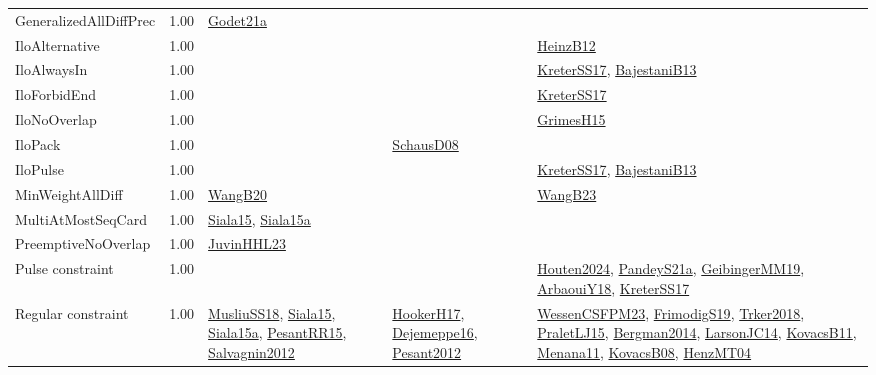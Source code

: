{\begin{longtable}{p{3cm}r>{\raggedright\arraybackslash}p{6cm}>{\raggedright\arraybackslash}p{6cm}>{\raggedright\arraybackslash}p{8cm}}
\index{GeneralizedAllDiffPrec}\index{Constraints!GeneralizedAllDiffPrec}GeneralizedAllDiffPrec &  1.00 & \hyperref[detail:Godet21a]{Godet21a} &  & \\
\index{IloAlternative}\index{Constraints!IloAlternative}IloAlternative &  1.00 &  &  & \hyperref[detail:HeinzB12]{HeinzB12}\\
\index{IloAlwaysIn}\index{Constraints!IloAlwaysIn}IloAlwaysIn &  1.00 &  &  & \hyperref[detail:KreterSS17]{KreterSS17}, \hyperref[detail:BajestaniB13]{BajestaniB13}\\
\index{IloForbidEnd}\index{Constraints!IloForbidEnd}IloForbidEnd &  1.00 &  &  & \hyperref[detail:KreterSS17]{KreterSS17}\\
\index{IloNoOverlap}\index{Constraints!IloNoOverlap}IloNoOverlap &  1.00 &  &  & \hyperref[detail:GrimesH15]{GrimesH15}\\
\index{IloPack}\index{Constraints!IloPack}IloPack &  1.00 &  & \hyperref[detail:SchausD08]{SchausD08} & \\
\index{IloPulse}\index{Constraints!IloPulse}IloPulse &  1.00 &  &  & \hyperref[detail:KreterSS17]{KreterSS17}, \hyperref[detail:BajestaniB13]{BajestaniB13}\\
\index{MinWeightAllDiff}\index{Constraints!MinWeightAllDiff}MinWeightAllDiff &  1.00 & \hyperref[detail:WangB20]{WangB20} &  & \hyperref[detail:WangB23]{WangB23}\\
\index{MultiAtMostSeqCard}\index{Constraints!MultiAtMostSeqCard}MultiAtMostSeqCard &  1.00 & \hyperref[detail:Siala15]{Siala15}, \hyperref[detail:Siala15a]{Siala15a} &  & \\
\index{PreemptiveNoOverlap}\index{Constraints!PreemptiveNoOverlap}PreemptiveNoOverlap &  1.00 & \hyperref[detail:JuvinHHL23]{JuvinHHL23} &  & \\
\index{Pulse constraint}\index{Constraints!Pulse constraint}Pulse constraint &  1.00 &  &  & \hyperref[detail:Houten2024]{Houten2024}, \hyperref[detail:PandeyS21a]{PandeyS21a}, \hyperref[detail:GeibingerMM19]{GeibingerMM19}, \hyperref[detail:ArbaouiY18]{ArbaouiY18}, \hyperref[detail:KreterSS17]{KreterSS17}\\
\index{Regular constraint}\index{Constraints!Regular constraint}Regular constraint &  1.00 & \hyperref[detail:MusliuSS18]{MusliuSS18}, \hyperref[detail:Siala15]{Siala15}, \hyperref[detail:Siala15a]{Siala15a}, \hyperref[detail:PesantRR15]{PesantRR15}, \hyperref[detail:Salvagnin2012]{Salvagnin2012} & \hyperref[detail:HookerH17]{HookerH17}, \hyperref[detail:Dejemeppe16]{Dejemeppe16}, \hyperref[detail:Pesant2012]{Pesant2012} & \hyperref[detail:WessenCSFPM23]{WessenCSFPM23}, \hyperref[detail:FrimodigS19]{FrimodigS19}, \hyperref[detail:Trker2018]{Trker2018}, \hyperref[detail:PraletLJ15]{PraletLJ15}, \hyperref[detail:Bergman2014]{Bergman2014}, \hyperref[detail:LarsonJC14]{LarsonJC14}, \hyperref[detail:KovacsB11]{KovacsB11}, \hyperref[detail:Menana11]{Menana11}, \hyperref[detail:KovacsB08]{KovacsB08}, \hyperref[detail:HenzMT04]{HenzMT04}\\

\end{longtable}}
